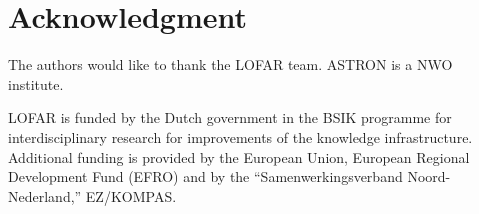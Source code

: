 \documentclass[journal]{IEEEtran}
\begin{document}
%



\section{}


\section*{Acknowledgment}


The authors would like to thank the LOFAR team. ASTRON is a NWO institute.

LOFAR is funded by the Dutch government in the BSIK programme for
interdisciplinary research for improvements of the knowledge infrastructure.
Additional funding is provided by the European Union, European Regional
Development Fund (EFRO) and by the ``Samenwerkingsverband Noord-Nederland,''
EZ/KOMPAS.

\ifCLASSOPTIONcaptionsoff
  \newpage
\fi



\end{document}
